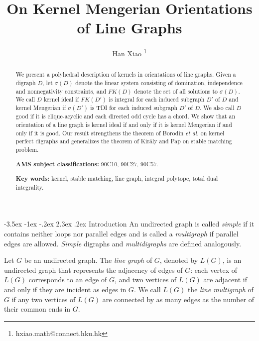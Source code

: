 \documentclass[11pt]{article}
\title{{\LARGE\bf  On Kernel Mengerian Orientations of Line Graphs}}
\date{}
\author{Han Xiao \footnote{hxiao.math@connect.hku.hk}}
\affil{Department of Mathematics, 

The University of Hong Kong,

Hong Kong, China
}
\makeatletter
\numberwithin{theorem}{section}
\renewcommand\section{%
  \@startsection{section}{1}
                {\z@}%
                {-3.5ex \@plus -1ex \@minus -.2ex}%
                {2.3ex \@plus.2ex}%
                {\large\bfseries}%
}
\makeatother
\begin{document}

\maketitle

\jot

\hfill

\begin{abstract}
We present a polyhedral description of kernels in orientations of line graphs.
Given a digraph $D$, let $\sigma(D)$ denote the linear system consisting of domination, independence and nonnegativity constraints, and $FK(D)$ denote the set of all solutions to $\sigma(D)$. We call $D$ kernel ideal if $FK(D')$ is integral for each induced subgraph $D'$ of $D$ and kernel Mengerian if $\sigma(D')$ is TDI for each induced subgraph $D'$ of $D$. We also call $D$ good if it is clique-acyclic and each directed odd cycle has a chord.
We show that an orientation of a line graph is kernel ideal if and only if it is kernel Mengerian if and only if it is good. Our result strengthens the theorem of Borodin \textit{et al.} \cite{BoroKost98} on kernel perfect digraphs and generalizes the theorem of Kir\'{a}ly and Pap \cite{KiraPap08} on stable matching problem.

\hfill

\hfill

\noindent\textbf{AMS subject classifications:} 90C10, 90C27, 90C57.


\noindent\textbf{Key words:} kernel, stable matching, line graph, integral polytope, total dual integrality.
\end{abstract}


\newpage
\section{Introduction}
\label{intro}
An undirected graph is called \textit{simple} if it contains neither loops nor parallel edges and is called a \textit{multigraph} if parallel edges are allowed. 
\textit{Simple} digraphs and \textit{multidigraphs} are defined analogously. 

Let $G$ be an undirected graph.
The \textit{line graph} of $G$, denoted by $L(G)$, is an undirected graph that represents the adjacency of edges of $G$: each vertex of $L(G)$ corresponds to an edge of $G$, and two vertices of $L(G)$ are adjacent if and only if they are incident as edges in $G$.
We call $L(G)$ the \textit{line multigraph} of $G$ if any two vertices of $L(G)$ are connected by as many edges as the number of their common ends in $G$. 
\end{document}
